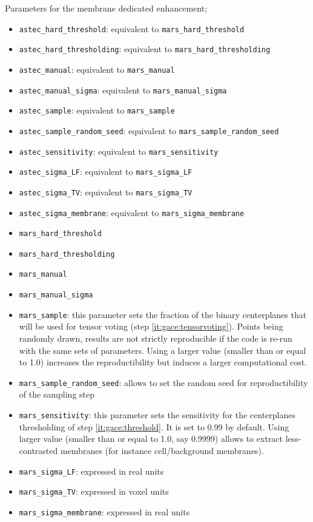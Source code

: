 Parameters for the membrane dedicated enhancement;
\begin{itemize}
\itemsep -0.5ex
\item \texttt{astec\_hard\_threshold}: equivalent to
      \texttt{mars\_hard\_threshold}
\item \texttt{astec\_hard\_thresholding}: equivalent to
      \texttt{mars\_hard\_thresholding}
\item \texttt{astec\_manual}: equivalent to
      \texttt{mars\_manual}
\item \texttt{astec\_manual\_sigma}: equivalent to
      \texttt{mars\_manual\_sigma}
\item \texttt{astec\_sample}: equivalent to
      \texttt{mars\_sample}
\item \texttt{astec\_sample\_random\_seed}: equivalent to
      \texttt{mars\_sample\_random\_seed}
\item \texttt{astec\_sensitivity}: equivalent to
      \texttt{mars\_sensitivity}
\item \texttt{astec\_sigma\_LF}: equivalent to
      \texttt{mars\_sigma\_LF}
\item \texttt{astec\_sigma\_TV}: equivalent to
      \texttt{mars\_sigma\_TV}
\item \texttt{astec\_sigma\_membrane}: equivalent to
      \texttt{mars\_sigma\_membrane}
\item \texttt{mars\_hard\_threshold}
\item \texttt{mars\_hard\_thresholding}
\item \texttt{mars\_manual}
\item \texttt{mars\_manual\_sigma}
\item \texttt{mars\_sample}: this parameter sets the fraction of the binary centerplanes that will be used for tensor voting (step \ref{it:gace:tensorvoting}). Points being randomly drawn, results are not strictly reproducible if the code is re-run with the same sets of parameters. Using a larger value (smaller than or equal to 1.0) increases the reproductibility but induces a larger computational cost.
\item \texttt{mars\_sample\_random\_seed}: allows to set the random seed for reproductibility of the sampling step
\item \texttt{mars\_sensitivity}: this parameter sets the sensitivity for the centerplanes thresholding of step \ref{it:gace:threshold}. It is set to 0.99 by default. Using larger value (smaller than or equal to 1.0, say 0.9999) allows to extract less-contrasted membranes (for instance cell/background membranes).
\item \texttt{mars\_sigma\_LF}: expressed in real units
\item \texttt{mars\_sigma\_TV}: expressed in voxel units
\item \texttt{mars\_sigma\_membrane}: expressed in real units
\end{itemize}

